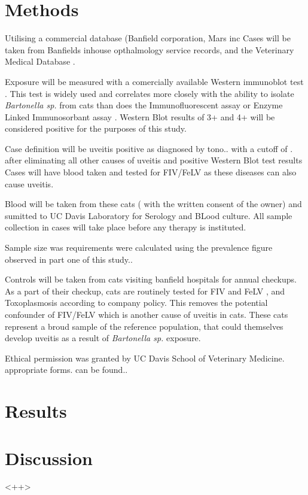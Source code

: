 \documentclass[12pt]{article}
\begin{document}
\section{Methods}
	Utilising a commercial database (Banfield corporation, Mars inc
	Cases will be taken from Banfields inhouse opthalmology service records, and the Veterinary Medical Database \cite{UniversityVeterinary}.

	Exposure will be measured with a comercially available Western immunoblot test \cite{febart}. This test is widely used and correlates more closely with the ability to isolate \emph{Bartonella sp.} from cats than does the Immunofluorescent assay or Enzyme Linked Immunosorbant assay \cite{Jr1995}. 
	Western Blot results of 3+ and 4+ will be considered positive for the purposes of this study. 


	Case definition will be uveitis positive as diagnosed by tono.. with a cutoff of .
	after eliminating all other causes of uveitis and positive Western Blot test results
	Cases will have blood taken and tested for FIV/FeLV as these diseases can also cause uveitis.

	Blood will be taken from these cats ( with the written consent of the owner) and sumitted to UC Davis Laboratory for Serology and BLood culture.
	All sample collection in cases will take place before any therapy is instituted.

	Sample size was requirements were calculated using the prevalence figure observed in part one of this study..

	Controls will be taken from cats visiting banfield hospitals for annual checkups. As a part of their checkup, cats are routinely tested for FIV and FeLV , and Toxoplasmosis according to company policy. This removes the potential confounder of FIV/FeLV which is another cause of uveitis in cats. These cats represent a broud sample of the reference population, that could themselves develop uveitis as a result of \emph{Bartonella sp.} exposure.
	


	Ethical permission was granted by UC Davis School of Veterinary Medicine. appropriate forms. can be found..

\section{Results}
\section{Discussion}
<++>
\end{document}
